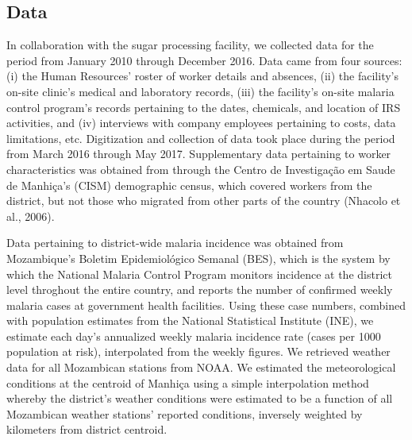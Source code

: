 \documentclass[]{article}
\begin{document}
\subsection{Data}\label{data}

In collaboration with the sugar processing facility, we collected data
for the period from January 2010 through December 2016. Data came from
four sources: (i) the Human Resources' roster of worker details and
absences, (ii) the facility's on-site clinic's medical and laboratory
records, (iii) the facility's on-site malaria control program's records
pertaining to the dates, chemicals, and location of IRS activities, and
(iv) interviews with company employees pertaining to costs, data
limitations, etc. Digitization and collection of data took place during
the period from March 2016 through May 2017. Supplementary data
pertaining to worker characteristics was obtained from through the
Centro de Investigação em Saude de Manhiça's (CISM) demographic census,
which covered workers from the district, but not those who migrated from
other parts of the country (Nhacolo et al., 2006).

Data pertaining to district-wide malaria incidence was obtained from
Mozambique's Boletim Epidemiológico Semanal (BES), which is the system
by which the National Malaria Control Program monitors incidence at the
district level throghout the entire country, and reports the number of
confirmed weekly malaria cases at government health facilities. Using
these case numbers, combined with population estimates from the National
Statistical Institute (INE), we estimate each day's annualized weekly
malaria incidence rate (cases per 1000 population at risk), interpolated
from the weekly figures. We retrieved weather data for all Mozambican
stations from NOAA. We estimated the meteorological conditions at the
centroid of Manhiça using a simple interpolation method whereby the
district's weather conditions were estimated to be a function of all
Mozambican weather stations' reported conditions, inversely weighted by
kilometers from district centroid.
\end{document}
